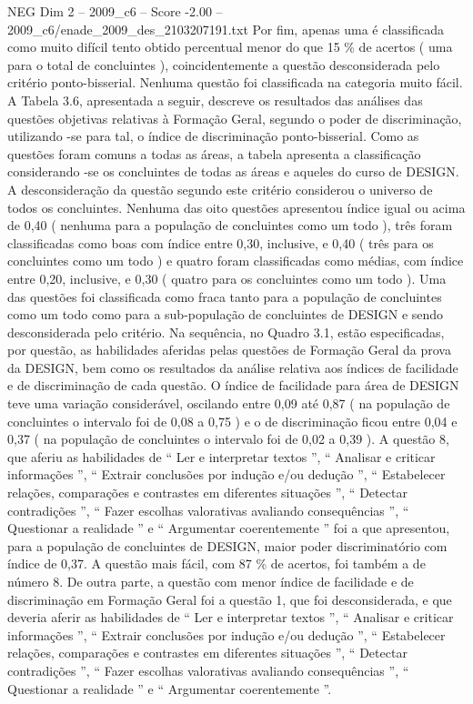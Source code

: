 \begin{textsample}{NEG Dim 2 – 2009\_c6 – Score -2.00 – 2009\_c6/enade\_2009\_des\_2103207191.txt}
Por fim, apenas uma é classificada como muito difícil tento obtido percentual menor do que 15 \% de acertos ( uma para o total de concluintes ), coincidentemente a questão desconsiderada pelo critério ponto-bisserial.
Nenhuma questão foi classificada na categoria muito fácil.
A Tabela 3.6, apresentada a seguir, descreve os resultados das análises das questões objetivas relativas à Formação Geral, segundo o poder de discriminação, utilizando -se para tal, o índice de discriminação ponto-bisserial.
Como as questões foram comuns a todas as áreas, a tabela apresenta a classificação considerando -se os concluintes de todas as áreas e aqueles do curso de DESIGN.
A desconsideração da questão segundo este critério considerou o universo de todos os concluintes.
Nenhuma das oito questões apresentou índice igual ou acima de 0,40 ( nenhuma para a população de concluintes como um todo ), três foram classificadas como boas com índice entre 0,30, inclusive, e 0,40 ( três para os concluintes como um todo ) e quatro foram classificadas como médias, com índice entre 0,20, inclusive, e 0,30 ( quatro para os concluintes como um todo ).
Uma das questões foi classificada como fraca tanto para a população de concluintes como um todo como para a sub-população de concluintes de DESIGN e sendo desconsiderada pelo critério.
Na sequência, no Quadro 3.1, estão especificadas, por questão, as habilidades aferidas pelas questões de Formação Geral da prova da DESIGN, bem como os resultados da análise relativa aos índices de facilidade e de discriminação de cada questão.
O índice de facilidade para área de DESIGN teve uma variação considerável, oscilando entre 0,09 até 0,87 ( na população de concluintes o intervalo foi de 0,08 a 0,75 ) e o de discriminação ficou entre 0,04 e 0,37 ( na população de concluintes o intervalo foi de 0,02 a 0,39 ).
A questão 8, que aferiu as habilidades de “ Ler e interpretar textos ”, “ Analisar e criticar informações ”, “ Extrair conclusões por indução e/ou dedução ”, “ Estabelecer relações, comparações e contrastes em diferentes situações ”, “ Detectar contradições ”, “ Fazer escolhas valorativas avaliando consequências ”, “ Questionar a realidade ” e “ Argumentar coerentemente ” foi a que apresentou, para a população de concluintes de DESIGN, maior poder discriminatório com índice de 0,37.
A questão mais fácil, com 87 \% de acertos, foi também a de número 8.
De outra parte, a questão com menor índice de facilidade e de discriminação em Formação Geral foi a questão 1, que foi desconsiderada, e que deveria aferir as habilidades de “ Ler e interpretar textos ”, “ Analisar e criticar informações ”, “ Extrair conclusões por indução e/ou dedução ”, “ Estabelecer relações, comparações e contrastes em diferentes situações ”, “ Detectar contradições ”, “ Fazer escolhas valorativas avaliando consequências ”, “ Questionar a realidade ” e “ Argumentar coerentemente ”.

\end{textsample}

